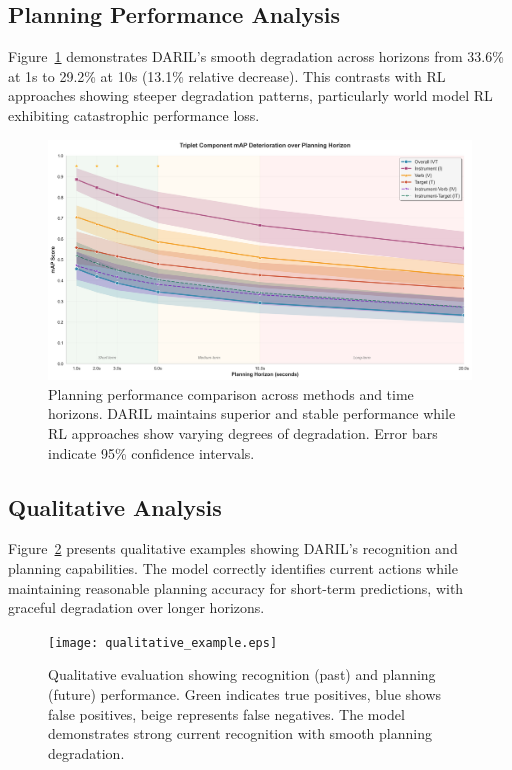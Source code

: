 \documentclass[runningheads]{llncs}
\begin{document}
\subsection{Planning Performance Analysis}

Figure~\ref{fig:planning_analysis} demonstrates DARIL's smooth degradation across horizons from 33.6\% at 1s to 29.2\% at 10s (13.1\% relative decrease). This contrasts with RL approaches showing steeper degradation patterns, particularly world model RL exhibiting catastrophic performance loss.

\begin{figure}[h]
\centering
\includegraphics[width=\textwidth]{planning_analysis_simple.png}
\caption{Planning performance comparison across methods and time horizons. DARIL maintains superior and stable performance while RL approaches show varying degrees of degradation. Error bars indicate 95\% confidence intervals.}
\label{fig:planning_analysis}
\end{figure}

\subsection{Qualitative Analysis}

Figure~\ref{fig:qualitative} presents qualitative examples showing DARIL's recognition and planning capabilities. The model correctly identifies current actions while maintaining reasonable planning accuracy for short-term predictions, with graceful degradation over longer horizons.

\begin{figure}[h]
\centering
\texttt{[image: qualitative\_example.eps]}
\caption{Qualitative evaluation showing recognition (past) and planning (future) performance. Green indicates true positives, blue shows false positives, beige represents false negatives. The model demonstrates strong current recognition with smooth planning degradation.}
\label{fig:qualitative}
\end{figure}
\end{document}
